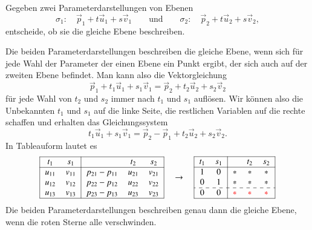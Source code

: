 \begin{aufgabe}
Gegeben zwei Parameterdarstellungen von Ebenen
\begin{equation*}
\sigma_1:\quad
\vec{p}_1+t\vec{u}_1+s\vec{v}_1
\qquad\text{und}\qquad
\sigma_2:\quad
\vec{p}_2+t\vec{u}_2+s\vec{v}_2,
\end{equation*}
entscheide, ob sie die gleiche Ebene beschreiben.
\end{aufgabe}
Die beiden Parameterdarstellungen beschreiben die gleiche Ebene, wenn
sich für jede Wahl der Parameter der einen Ebene ein Punkt ergibt,
der sich auch auf der zweiten Ebene befindet.
Man kann also die Vektorgleichung
\[
\vec{p}_1+t_1\vec{u}_1+s_1\vec{v}_1
=
\vec{p}_2+t_2\vec{u}_2+s_2\vec{v}_2
\]
für jede Wahl von $t_2$ und $s_2$ immer nach $t_1$ und $s_1$ auflösen.
Wir können also die Unbekannten $t_1$ und $s_1$ auf die linke Seite, die
restlichen Variablen auf die rechte schaffen und erhalten das Gleichungssystem
\[
t_1\vec{u}_1+s_1\vec{v}_1
=
\vec{p}_2-
\vec{p}_1
+t_2\vec{u}_2+s_2\vec{v}_2.
\]
In Tableauform lautet es
\[
\begin{tabular}{| >{$}c<{$} >{$}c<{$}| >{$}c<{$} >{$}c<{$} >{$}c<{$}|}
\hline
t_1&s_1&&t_2&s_2\\
\hline
u_{11}&v_{11}&p_{21}-p_{11}&u_{21}&v_{21}\\
u_{12}&v_{12}&p_{22}-p_{12}&u_{22}&v_{22}\\
u_{13}&v_{13}&p_{23}-p_{13}&u_{23}&v_{23}\\
\hline
\end{tabular}
\quad\rightarrow\quad
\begin{tabular}{| >{$}c<{$} >{$}c<{$}| >{$}c<{$} >{$}c<{$} >{$}c<{$}|}
\hline
t_1&s_1&&t_2&s_2\\
\hline
1&0&*&*&*\\
0&1&*&*&*\\
\hdashline
0&0&\color{red}*&\color{red}*&\color{red}*\\
\hline
\end{tabular}
\]
Die beiden Parameterdarstellungen beschreiben genau dann die gleiche
Ebene, wenn die {\color{red}roten} Sterne alle verschwinden.


